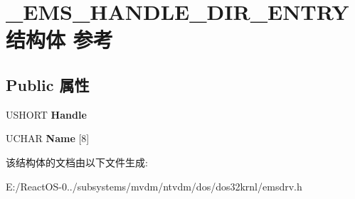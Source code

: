 \hypertarget{struct___e_m_s___h_a_n_d_l_e___d_i_r___e_n_t_r_y}{}\section{\+\_\+\+E\+M\+S\+\_\+\+H\+A\+N\+D\+L\+E\+\_\+\+D\+I\+R\+\_\+\+E\+N\+T\+R\+Y结构体 参考}
\label{struct___e_m_s___h_a_n_d_l_e___d_i_r___e_n_t_r_y}
\subsection*{Public 属性}
\begin{DoxyCompactItemize}
\item 
\mbox{\label{struct___e_m_s___h_a_n_d_l_e___d_i_r___e_n_t_r_y_a8c751bf805483b19bf7277c8c37832ea}} 
U\+S\+H\+O\+RT {\bfseries Handle}
\item 
\mbox{\label{struct___e_m_s___h_a_n_d_l_e___d_i_r___e_n_t_r_y_acd2f819281527ef67bbecf5114cd5a52}} 
U\+C\+H\+AR {\bfseries Name} \mbox{[}8\mbox{]}
\end{DoxyCompactItemize}


该结构体的文档由以下文件生成\+:\begin{DoxyCompactItemize}
\item 
E\+:/\+React\+O\+S-\/0../subsystems/mvdm/ntvdm/dos/dos32krnl/emsdrv.\+h\end{DoxyCompactItemize}
